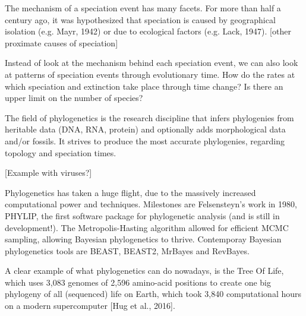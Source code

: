 The mechanism of a speciation event has many facets.
For more than half a century ago, it was hypothesized
that speciation is caused by geographical isolation (e.g. Mayr, 1942)
or due to ecological factors (e.g. Lack, 1947). [other proximate 
causes of speciation]

%

Instead of look at the mechanism behind each speciation event,
we can also look at patterns of speciation events through evolutionary time.
How do the rates at which speciation and extinction take place through time
change? Is there an upper limit on the number of species?


The field of phylogenetics is the research discipline that
infers phylogenies from heritable data (DNA, RNA, protein) and
optionally adds morphological data and/or fossils. It strives
to produce the most accurate phylogenies, regarding topology
and speciation times.

[Example with viruses?]

%
%
%

Phylogenetics has taken a huge flight, due to the massively increased
computational power and techniques. Milestones are Felsensteyn's work
in 1980, PHYLIP, the first software package for phylogenetic 
analysis (and is still in development!).
The Metropolis-Hasting algorithm allowed for efficient MCMC
sampling, allowing Bayesian phylogenetics to thrive. Contemporay
Bayesian phylogenetics tools are BEAST, BEAST2, MrBayes and RevBayes.

%
%

A clear example of what phylogenetics can do nowadays,
is the Tree Of Life, which uses 
3,083 genomes of 2,596 amino-acid positions 
to create one big phylogeny of all (sequenced) life on Earth,
which took 3,840 computational hours on a modern supercomputer [Hug et al., 2016].

%
%
%

